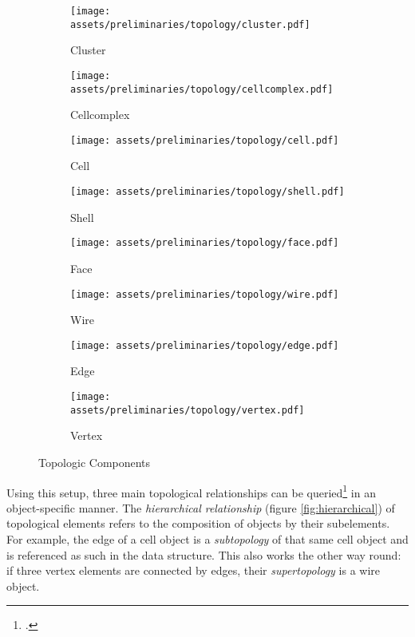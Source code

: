 \documentclass[a4paper, 12pt]{report}
\begin{document}
\begin{figure}
\centering
\begin{subfigure}{.25\textwidth}
\centering
\texttt{[image: assets/preliminaries/topology/cluster.pdf]}
\caption{Cluster}
\label{fig:cluster}
\end{subfigure}%
\begin{subfigure}{.25\textwidth}
\centering
\texttt{[image: assets/preliminaries/topology/cellcomplex.pdf]}
\caption{Cellcomplex}
\label{fig:cellcomplex}
\end{subfigure}%
\begin{subfigure}{.25\textwidth}
\centering
\texttt{[image: assets/preliminaries/topology/cell.pdf]}
\caption{Cell}
\label{fig:cell}
\end{subfigure}%
\begin{subfigure}{.25\textwidth}
\centering
\texttt{[image: assets/preliminaries/topology/shell.pdf]}
\caption{Shell}
\label{fig:shell}
\end{subfigure}
\begin{subfigure}{.25\textwidth}
\centering
\texttt{[image: assets/preliminaries/topology/face.pdf]}
\caption{Face}
\label{fig:face}
\end{subfigure}%
\begin{subfigure}{.25\textwidth}
\centering
\texttt{[image: assets/preliminaries/topology/wire.pdf]}
\caption{Wire}
\label{fig:wire}
\end{subfigure}%
\begin{subfigure}{.25\textwidth}
\centering
\texttt{[image: assets/preliminaries/topology/edge.pdf]}
\caption{Edge}
\label{fig:edge}
\end{subfigure}%
\begin{subfigure}{.25\textwidth}
\centering
\texttt{[image: assets/preliminaries/topology/vertex.pdf]}
\caption{Vertex}
\label{fig:vertex}
\end{subfigure}
\caption{Topologic Components}
\label{fig:topologic-components}
\end{figure}

Using this setup, three main topological relationships can be queried\footcite{jabi2018topologic} in an object-specific manner. The \textit{hierarchical relationship} (figure \ref{fig:hierarchical}) of topological elements refers to the composition of objects by their subelements. For example, the edge of a cell object is a \textit{subtopology} of that same cell object and is referenced as such in the data structure. This also works the other way round: if three vertex elements are connected by edges, their \textit{supertopology} is a wire object.
\end{document}

